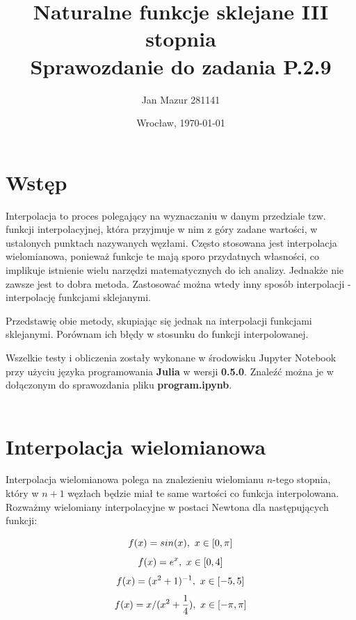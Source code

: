 \documentclass{article}
\author{Jan Mazur 281141}
\date{Wrocław, \today}
\title{\textbf{Naturalne funkcje sklejane III stopnia} \\ Sprawozdanie do zadania P.2.9	}
\begin{document}
\maketitle

\section{Wstęp}

Interpolacja to proces polegający na wyznaczaniu w danym przedziale tzw. funkcji interpolacyjnej, która przyjmuje w nim z góry zadane wartości, w ustalonych punktach nazywanych węzłami. \cite{wikipedia_pl}
Często stosowana jest interpolacja wielomianowa, ponieważ  funkcje te mają sporo przydatnych własności, co implikuje istnienie wielu narzędzi matematycznych do ich analizy. Jednakże nie zawsze jest to dobra metoda.
Zastosować można wtedy inny sposób interpolacji - interpolację funkcjami sklejanymi.

Przedstawię obie metody, skupiając się jednak na interpolacji funkcjami sklejanymi. Porównam ich błędy w stosunku do funkcji interpolowanej.

Wszelkie testy i obliczenia zostały wykonane w środowisku Jupyter Notebook przy użyciu języka programowania \textbf{Julia} w wersji \textbf{0.5.0}.
Znaleźć można je w dołączonym do sprawozdania pliku \textbf{program.ipynb}.\\\\

\section{Interpolacja wielomianowa}
Interpolacja wielomianowa polega na znalezieniu wielomianu $n$-tego stopnia, który w $n+1$ węzłach będzie miał te same wartości co funkcja interpolowana. Rozważmy wielomiany interpolacyjne w postaci Newtona dla następujących funkcji:

\begin{equation}\label{fun1}
	f(x) = sin(x), \textnormal{ } x \in [0,\pi]
\end{equation}
\begin{equation}\label{fun2}
	f(x) = e^x, \textnormal{ } x \in [0,4]
\end{equation}
\begin{equation}\label{fun3}
	f(x) = (x^{2}+1)^{-1}, \textnormal{ } x \in [-5,5]
\end{equation}
\begin{equation}\label{fun4}
	f(x) = x/(x^{2} + \frac{1}{4}), \textnormal{ } x \in [-\pi,\pi]
\end{equation}
\end{document}
